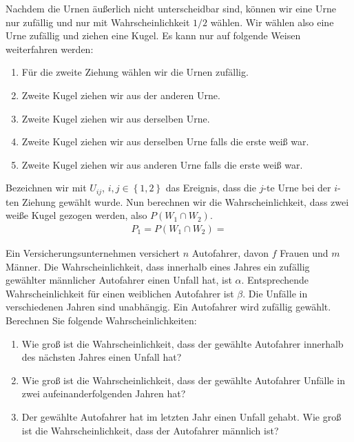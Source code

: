 \solution
Nachdem die Urnen äußerlich nicht unterscheidbar sind, können wir eine
Urne nur zufällig und nur mit Wahrscheinlichkeit $1/2$ wählen. Wir wählen 
also eine Urne zufällig und ziehen eine Kugel. Es kann nur auf folgende Weisen
weiterfahren werden:

\begin{enumerate}
    \item Für die zweite Ziehung wählen wir die Urnen zufällig.
    \item Zweite Kugel ziehen wir aus der anderen Urne. 
    \item Zweite Kugel ziehen wir aus derselben Urne.
    \item Zweite Kugel ziehen wir aus derselben Urne falls die erste weiß war.
    \item Zweite Kugel ziehen wir aus anderen Urne falls die erste weiß war.
\end{enumerate}
Bezeichnen wir mit $U_{ij}$, $i,j\in \left\{ 1,2 \right\}$ das Ereignis, dass
die $j$-te Urne bei der $i$-ten Ziehung gewählt wurde. Nun berechnen wir die 
Wahrscheinlichkeit, dass zwei weiße Kugel gezogen werden, also $P(W_1 \cap W_2)$.
\begin{align*}
    P_1 = P(W_1 \cap W_2) = 
\end{align*}


 Ein
Versicherungsunternehmen versichert $n$ Autofahrer, davon $f$ Frauen und $m$
Männer. Die Wahrscheinlichkeit, dass innerhalb eines Jahres ein zufällig
gewählter männlicher Autofahrer einen Unfall hat, ist $\alpha$. Entsprechende
Wahrscheinlichkeit für einen weiblichen Autofahrer ist $\beta$. Die Unfälle in
verschiedenen Jahren sind unabhängig. Ein Autofahrer wird zufällig gewählt. 
Berechnen Sie folgende Wahrscheinlichkeiten:
\begin{enumerate}
    \item Wie groß ist die Wahrscheinlichkeit, dass der gewählte Autofahrer 
        innerhalb des nächsten Jahres einen Unfall hat?

    \item Wie groß ist die Wahrscheinlichkeit, dass der gewählte Autofahrer
        Unfälle in zwei aufeinanderfolgenden Jahren hat?

    \item Der gewählte Autofahrer hat im letzten Jahr einen Unfall gehabt. Wie
        groß ist die Wahrscheinlichkeit, dass der Autofahrer männlich ist?
\end{enumerate}

